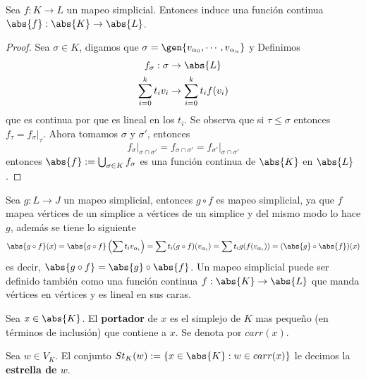 \documentclass{article}
\begin{document}
\vspace{2mm}
\begin{lema}
    Sea $f:K\to L$ un mapeo simplicial. Entonces induce una función continua 
    $\abs{f}:\abs{K}\to\abs{L}$.
\end{lema}
\begin{proof}
    Sea $\sigma\in K$, digamos que $\sigma=\gen{v_{\alpha_{0}},\cdots,v_{\alpha_{n}}}$ y Definimos
    \begin{align*}
        f_{\sigma}:\sigma &\to \abs{L} \\
        \sum_{i=0}^{k}t_{i}v_{i} &\to \sum_{i=0}^{k}t_{i}f(v_{i})
    \end{align*}
    que es continua por que es lineal en los $t_{i}$. Se observa que si $\tau\leq\sigma$ entonces
    $f_{\tau}=f_{\sigma}\big|_{\tau}$. Ahora tomamos $\sigma$ y $\sigma'$, entonces
    \begin{equation*}
        f_{\sigma}\big|_{\sigma\cap\sigma'}=f_{\sigma\cap\sigma'}
        =f_{\sigma'}\big|_{\sigma\cap\sigma'}
    \end{equation*}
    entonces $\abs{f}:=\bigcup_{\sigma\in K}f_{\sigma}$ es una función continua de $\abs{K}$ en 
    $\abs{L}$.
\end{proof}
\noindent Sea $g:L\to J$ un mapeo simplicial, entonces $g\circ f$ es mapeo simplicial, ya que $f$
mapea vértices de un simplice a vértices de un simplice y del mismo modo lo hace $g$, además se 
tiene lo siguiente
\begin{equation*}
    \abs{g\circ f}(x)=\abs{g\circ f}\left(\sum t_{i}v_{\alpha_{i}}\right)
    =\sum t_{i}(g\circ f)(v_{\alpha_{i}})=\sum t_{i}g(f(v_{\alpha_{i}}))=(\abs{g}\circ\abs{f})(x)
\end{equation*}
es decir, $\abs{g\circ f}=\abs{g}\circ\abs{f}$. Un mapeo simplicial puede ser definido también 
como una función continua $f:\abs{K}\to\abs{L}$ que manda vértices en vértices y es lineal en sus 
caras.

\vspace{2mm}
\begin{dfn}
    Sea $x\in\abs{K}$. El \textbf{portador} de $x$ es el simplejo de $K$ mas pequeño (en términos
    de inclusión) que contiene a $x$. Se denota por $carr(x)$.
\end{dfn}

\vspace{2mm}
\begin{dfn}
    Sea $w\in V_{K}$. El conjunto $St_{K}(w):=\{x\in\abs{K}:w\in carr(x)\}$ le decimos la 
    \textbf{estrella de $w$}.
\end{dfn}
\end{document}
